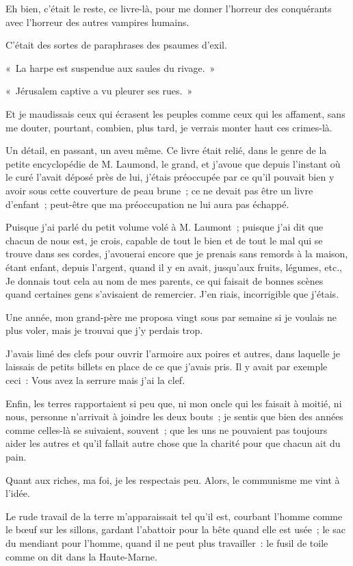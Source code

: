 \documentclass[french,twoside]{book} %
\begin{document}
Eh bien, c’était le reste, ce livre-là, pour me donner l’horreur des conquérants avec l’horreur des autres vampires humains.\par
C’était des sortes de paraphrases des psaumes d’exil.\par
« La harpe est suspendue aux saules du rivage. »\par
« Jérusalem captive a vu pleurer ses rues. »\par
Et je maudissais ceux qui écrasent les peuples comme ceux qui les affament, sans me douter, pourtant, combien, plus tard, je verrais monter haut ces crimes-là.\par
Un détail, en passant, un aveu même. Ce livre était relié, dans le genre de la petite encyclopédie  de M. Laumond, le grand, et j’avoue que depuis l’instant où le curé l’avait déposé près de lui, j’étais préoccupée par ce qu’il pouvait bien y avoir sous cette couverture de peau brune ; ce ne devait pas être un livre d’enfant ; peut-être que ma préoccupation ne lui aura pas échappé.\par
Puisque j’ai parlé du petit volume volé à M. Laumont ; puisque j’ai dit que chacun de nous est, je crois, capable de tout le bien et de tout le mal qui se trouve dans ses cordes, j’avouerai encore que je prenais sans remords à la maison, étant enfant, depuis l’argent, quand il y en avait, jusqu’aux fruits, légumes, etc., Je donnais tout cela au nom de mes parents, ce qui faisait de bonnes scènes quand certaines gens s’avisaient de remercier. J’en riais, incorrigible que j’étais.\par
Une année, mon grand-père me proposa vingt sous par semaine si je voulais ne plus voler, mais je trouvai que j’y perdais trop.\par
J’avais limé des clefs pour ouvrir l’armoire aux poires et autres, dans laquelle je laissais de petits billets en place de ce que j’avais pris. Il y avait par exemple ceci : Vous avez la serrure mais j’ai la clef.\par
Enfin, les terres rapportaient si peu que, ni mon oncle qui les faisait à moitié, ni nous, personne n’arrivait à joindre les deux bouts ; je sentis que  bien des années comme celles-là se suivaient, souvent ; que les uns ne pouvaient pas toujours aider les autres et qu’il fallait autre chose que la charité pour que chacun ait du pain.\par
Quant aux riches, ma foi, je les respectais peu. Alors, le communisme me vint à l’idée.\par
Le rude travail de la terre m’apparaissait tel qu’il est, courbant l’homme comme le bœuf sur les sillons, gardant l’abattoir pour la bête quand elle est usée ; le sac du mendiant pour l’homme, quand il ne peut plus travailler : le fusil de toile comme on dit dans la Haute-Marne.\par
\end{document}
